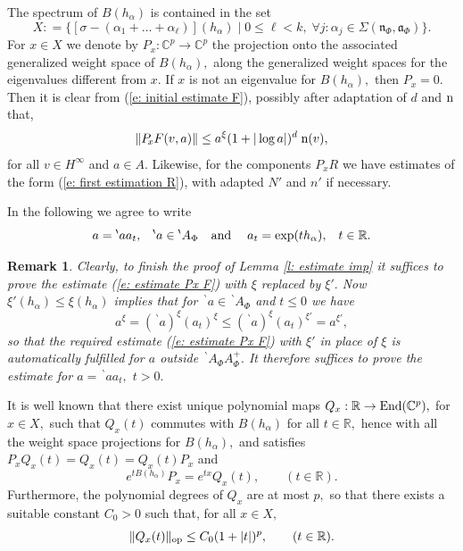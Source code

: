 \documentclass[12pt,a4paper]{article}
\newtheorem{Rem}[Thm]{Remark}
\newenvironment{rem}[0]{\begin{Rem}\noindent\rm}%
{\end{Rem}}
\def\qquad{\quad\quad}
\def\msy#1{{\mathbb #1}}
\def\C{{\msy C}}
\def\R{{\msy R}}
\def\ga{\alpha}
\def\gs{\sigma}
\def\gS{\Sigma}
\def\got#1{\mathfrak #1}
\def\fa{{\got a}}
\def\fn{{\got n}}
\def\to{\rightarrow}
\def\End{{\rm End}}
\numberwithin{Thm}{section}
\numberwithin{equation}{section}
\numberwithin{equation}{section}
\def\bp{\!{\,}^\backprime}
\begin{document}
The spectrum of $B(h_\ga)$ is contained in the set
$$
X : = \{ [\gs - (\ga_1 +  \ldots + \ga_\ell)](h_\ga)\mid 0\leq \ell < k, \;\forall j: \ga_j \in \gS(\fn_\Phi, \fa_\Phi) \}.
$$%
For $x \in X$ we denote by $P_x: \C^p \to \C^p$ the projection 
onto the associated generalized weight space of $B(h_\ga),$ along the generalized
weight spaces for the eigenvalues different from $x.$ 
If $x$ is not an eigenvalue for $B(h_\ga),$ 
then $P_x = 0.$ Then it is clear from (\ref{e: initial estimate F}), 
possibly after adaptation of $d$ and ${\rm n}$ 
that, 
\begin{equation}
\label{e: estimate Px F}
\|P_{\!x} F(v, a)\| \leq a^\xi ( 1+ |\log a|)^d \;{\rm n}(v),
\end{equation} 
for all $v \in H^\infty$ and $a \in A$. 
Likewise, for the components $P_{\! x} R$ we have estimates 
of the form (\ref{e: first estimation R}), with adapted $N'$ and $n'$ if necessary. 

In the following we agree to write
$$ 
a = \bp a a_t, \;\;\;\bp a \in \bp A_\Phi\quad  {\rm and} \quad \; a_t = \exp (th_\ga), \;\;\;t \in \R.
$$%

\begin{rem}
\label{r: restricted domain of estimate}
Clearly, to finish the proof of Lemma \ref{l: estimate imp} it suffices to prove the estimate (\ref{e: estimate Px F}) with $\xi$ replaced by $\xi'.$  Now $\xi'(h_\ga) \leq \xi(h_\ga)$ implies that for $\bp a \in \bp A_\Phi$ and $t \leq 0$ we have
$$ 
a^\xi = (\bp a)^\xi (a_t)^{\xi} \leq (\bp a)^\xi (a_t)^{\xi'}= a^{\xi'},
$$%
so that the required estimate (\ref{e: estimate Px F}) with $\xi'$ in place of $\xi$ 
is automatically fulfilled for $a$ outside $\bp A_\Phi  A_\Phi^+.$ It therefore
suffices to prove the estimate for $a = \bp a a_t,$ $t > 0.$ 
\end{rem}

It is well known that there exist unique polynomial maps 
$Q_x: \R \to \End (\C^p),$ for $x \in X,$ such that $Q_x(t)$ commutes with 
$B(h_\ga)$ for all $t \in \R,$ hence with all the weight space projections
for $B(h_\ga),$ and satisfies $P_x Q_x(t) = Q_x(t) = Q_x(t) P_x$ and 
\begin{equation}
e^{t B(h_\ga)} P_x = e^{tx} Q_x(t), \qquad (t \in \R).
\end{equation}
Furthermore, the polynomial degrees of $Q_x$ are at  most $p,$ so that
there exists a suitable constant $C_0 > 0$ such that, for all $x \in  X ,$ 
\begin{equation}
\label{e: estimate Q x}
\|Q_x(t)\|_{\rm op} \leq C_0 (1 + |t|)^p , \qquad (t \in \R). 
\end{equation}
\end{document}
